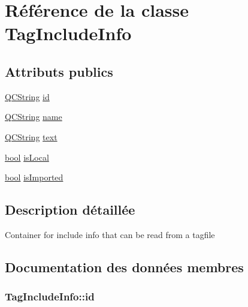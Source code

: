 \hypertarget{class_tag_include_info}{}\section{Référence de la classe Tag\+Include\+Info}
\label{class_tag_include_info}
\subsection*{Attributs publics}
\begin{DoxyCompactItemize}
\item 
\hyperlink{class_q_c_string}{Q\+C\+String} \hyperlink{class_tag_include_info_aae780b8503cb519554b16f9d767c4e38}{id}
\item 
\hyperlink{class_q_c_string}{Q\+C\+String} \hyperlink{class_tag_include_info_a60a7cf6f8fe2465630b5fbead1bcf44d}{name}
\item 
\hyperlink{class_q_c_string}{Q\+C\+String} \hyperlink{class_tag_include_info_ae282ee1c7897b57c6b6155742097c230}{text}
\item 
\hyperlink{qglobal_8h_a1062901a7428fdd9c7f180f5e01ea056}{bool} \hyperlink{class_tag_include_info_a4926eb44b0f0e2324b58501d4facb4b5}{is\+Local}
\item 
\hyperlink{qglobal_8h_a1062901a7428fdd9c7f180f5e01ea056}{bool} \hyperlink{class_tag_include_info_a9798905f48ab4a543317647199c206d0}{is\+Imported}
\end{DoxyCompactItemize}


\subsection{Description détaillée}
Container for include info that can be read from a tagfile 

\subsection{Documentation des données membres}
\hypertarget{class_tag_include_info_aae780b8503cb519554b16f9d767c4e38}{}
\subsubsection[{id}]{ Tag\+Include\+Info\+::id}\label{class_tag_include_info_aae780b8503cb519554b16f9d767c4e38}
\hypertarget{class_tag_include_info_a9798905f48ab4a543317647199c206d0}{}
